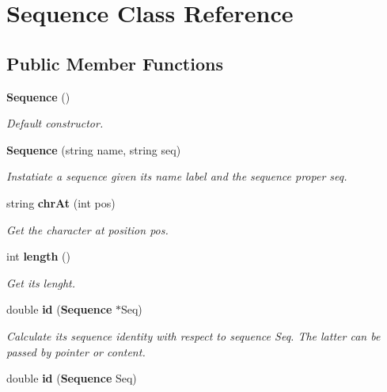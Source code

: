 \section{Sequence Class Reference}
\label{classSequence}
\subsection*{Public Member Functions}
\begin{CompactItemize}
\item 
{\bf Sequence} ()\label{classSequence_a0}

\begin{CompactList}\small\item\em Default constructor. \item\end{CompactList}\item 
{\bf Sequence} (string name, string seq)\label{classSequence_a1}

\begin{CompactList}\small\item\em Instatiate a sequence given its name label and the sequence proper seq. \item\end{CompactList}\item 
string {\bf chr\-At} (int pos)\label{classSequence_a2}

\begin{CompactList}\small\item\em Get the character at position pos. \item\end{CompactList}\item 
int {\bf length} ()\label{classSequence_a3}

\begin{CompactList}\small\item\em Get its lenght. \item\end{CompactList}\item 
double {\bf id} ({\bf Sequence} $\ast$Seq)
\begin{CompactList}\small\item\em Calculate its sequence identity with respect to sequence Seq. The latter can be passed by pointer or content. \item\end{CompactList}\item 
double {\bf id} ({\bf Sequence} Seq)\label{classSequence_a5}


\end{CompactItemize}
